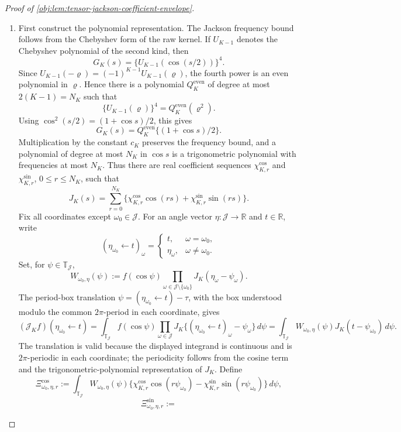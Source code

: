 \documentclass[11pt]{article}
\begin{document}
\begin{proof}[Proof of \cref{obj:lem:tensor-jackson-coefficient-envelope}]
\begin{enumerate}
\item
First construct the polynomial representation.  The Jackson frequency bound follows from the Chebyshev form of the raw kernel.  If \(U_{K-1}\) denotes the Chebyshev polynomial of the second kind, then
\[
G_K(s)=\{U_{K-1}(\cos(s/2))\}^{4}.
\]
Since \(U_{K-1}(-\varrho)=(-1)^{K-1}U_{K-1}(\varrho)\), the fourth power is an even polynomial in \(\varrho\).  Hence there is a polynomial \(Q_K^{\mathrm{even}}\) of degree at most \(2(K-1)=N_K\) such that
\[
\{U_{K-1}(\varrho)\}^{4}=Q_K^{\mathrm{even}}(\varrho^2).
\]
Using \(\cos^2(s/2)=(1+\cos s)/2\), this gives
\[
G_K(s)=Q_K^{\mathrm{even}}\{(1+\cos s)/2\}.
\]
Multiplication by the constant \(c_K\) preserves the frequency bound, and a polynomial of degree at most \(N_K\) in \(\cos s\) is a trigonometric polynomial with frequencies at most \(N_K\).  Thus there are real coefficient sequences \(\chi^{\cos}_{K,r}\) and \(\chi^{\sin}_{K,r}\), \(0\le r\le N_K\), such that
\[
J_K(s)=\sum_{r=0}^{N_K}
\{\chi^{\cos}_{K,r}\cos(rs)+\chi^{\sin}_{K,r}\sin(rs)\}.
\]
Fix all coordinates except \(\omega_0\in\mathcal J\).  For an angle vector \(\eta:\mathcal J\to\mathbb R\) and \(t\in\mathbb R\), write
\[
(\eta_{\omega_0}\leftarrow t)_\omega
=
\begin{cases}
t,&\omega=\omega_0,\\
\eta_\omega,&\omega\ne\omega_0.
\end{cases}
\]
Set, for \(\psi\in\mathbb T_{\mathcal J}\),
\[
W_{\omega_0,\eta}(\psi)
:=
f(\cos \psi)
\prod_{\omega\in\mathcal J\setminus\{\omega_0\}}
J_K(\eta_\omega-\psi_\omega).
\]
The period-box translation \(\psi=(\eta_{\omega_0}\leftarrow t)-\tau\), with the box understood modulo the common \(2\pi\)-period in each coordinate, gives
\[
(\mathcal J_K f)(\eta_{\omega_0}\leftarrow t)
=
\int_{\mathbb T_{\mathcal J}}
f(\cos\psi)
\prod_{\omega\in\mathcal J}
J_K\{(\eta_{\omega_0}\leftarrow t)_\omega-\psi_\omega\}\,d\psi
=
\int_{\mathbb T_{\mathcal J}}
W_{\omega_0,\eta}(\psi)J_K(t-\psi_{\omega_0})\,d\psi .
\]
The translation is valid because the displayed integrand is continuous and is \(2\pi\)-periodic in each coordinate; the periodicity follows from the cosine term and the trigonometric-polynomial representation of \(J_K\). %
Define
\[
\Xi^{\cos}_{\omega_0,\eta,r}
:=
\int_{\mathbb T_{\mathcal J}}
W_{\omega_0,\eta}(\psi)
\{\chi^{\cos}_{K,r}\cos(r\psi_{\omega_0})-\chi^{\sin}_{K,r}\sin(r\psi_{\omega_0})\}\,d\psi,
\]
\[
\Xi^{\sin}_{\omega_0,\eta,r}
:=
\]
\end{enumerate}
\end{proof}
\end{document}
